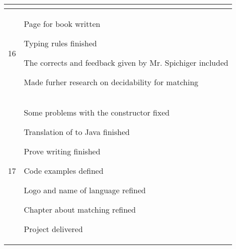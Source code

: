 \begin{center}
\begin{longtable}{|c|p{12cm}|}
\begin{journal}
\end{journal}
\\ \hline
16 &
\begin{journal}
	\item Page for book written
	\item Typing rules finished
	\item The corrects and feedback given by Mr. Spichiger included
	\item Made furher research on decidability for matching
\end{journal}
\\ \hline
17 &
\begin{journal}
	\item Some \mytype problems with the constructor fixed
	\item Translation of \ooplss to Java finished
	\item Prove writing finished
	\item Code examples defined
	\item Logo and name of language refined
	\item Chapter about matching refined
	\item Project delivered
\end{journal}
\\ \hline
\end{longtable}
\end{center}
